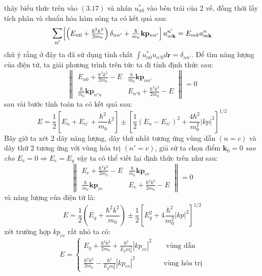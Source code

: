thây biểu thức trên vào $(3.17)$ và nhân $u_{n0}^*$ vào bên trái của 2 vế, đồng thời lấy tích phân và chuẩn hóa hàm sóng ta có kết quả sau:
\begin{equation}
\mathlarger{\sum_{n'}} \mathsmaller{\left[  \left(E_{n0}+\frac{\hbar^2 k^2}{2m_0}\right)\delta_{nn'}  +\frac{\hbar}{m_0}\mathbf{k}\mathbf{p}_{nn'}\right]a_{m\mathbf{k}}^{n'}}
=E_{mk}a_{m\mathbf{k}}^n
\end{equation}
chú ý rằng ở đây ta đã sử dụng tính chất $\int u_{n0}^*u_{n'0}d\mathbf{r}=\delta_{nn'}$. Để tìm năng lượng của điện tử, ta  giải phương trình trên tức ta đi tính định thức sau:
 \begin{equation}
 \begin{Vmatrix}
 E_{n0}+\frac{\hbar^2 k^2}{2m_0} -E       & \frac{\hbar}{m_0}\mathbf{k}\mathbf{p}_{nn'} \\
 \frac{\hbar}{m_0}\mathbf{k}\mathbf{p}_{n'n}    & E_{n'0}+\frac{\hbar^2 k^2}{2m_0} -E 
 \end{Vmatrix} =0
 \end{equation}
 sau vài bước tính toán ta có kết quả sau:
 \begin{equation}
 E = \frac{1}{2}\left[ E_n+E_{n'}+\frac{\hbar^2}{m_0}k^2\right] \pm \left[\frac{1}{2}\left(E_n-E_{n'}\right)^2+\frac{4\hbar^2}{m_0^2}|kp|^2\right]^{1/2}
\end{equation} 
 Bây giờ ta xét 2 dãy năng lượng, dãy thứ nhất tương ứng vùng dẫn $\left(n=c\right)$ và dãy thứ 2 tương ứng với vùng hóa trị $\left(n'=v\right)$, giả sử ta chọn điểm $\mathbf{k}_0=0 $ \emph{sao cho} $E_v=0\Longrightarrow E_c=E_g$
vậy ta có thể viết lại định thức trên như sau:
  \begin{equation}
 \begin{Vmatrix}
 E_{c}+\frac{\hbar^2 k^2}{2m_0} -E       & \frac{\hbar}{m_0}\mathbf{k}\mathbf{p}_{cv} \\
 \frac{\hbar}{m_0}\mathbf{k}\mathbf{p}_{vc}    & E_{v}+\frac{\hbar^2 k^2}{2m_0} -E 
 \end{Vmatrix} =0
 \end{equation}
 và năng lượng của điện tử là:
 \begin{equation}
 E = \frac{1}{2}\left(E_g+\frac{\hbar^2 k^2}{m_0} \right) \pm \frac{1}{2}\left[ E_g^2 +4\frac{\hbar^2}{m_0^2}|kp|^2\right]^{1/2}
 \end{equation}
xét trường hợp $kp_{cv}$  rất nhỏ ta có:
\begin{equation}
E=\left\{
 \begin{array}{cc}
E_g+\frac{\hbar^2 k^2}{2m_0}+\frac{\hbar^2}{E_gm_0^2}|kp_{cv}|^2 \qquad \text{vùng dẫn} \\
\frac{\hbar^2 k^2}{2m_0}-\frac{\hbar^2}{E_g m_0^2}|kp_{cv}|^2 \qquad \qquad \text{vùng hóa trị}
 \end{array} \right.
\end{equation}

